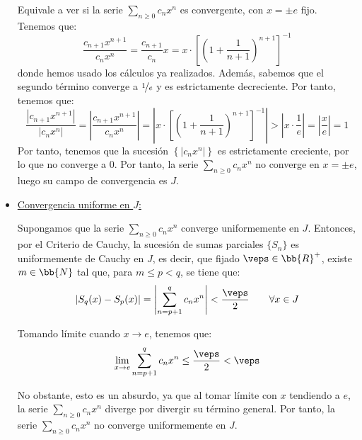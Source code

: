 \begin{ejercicio}
\begin{itemize}
        Equivale a ver si la serie
        $\sum\limits_{n\geq 0}c_nx^n$ es convergente, con $x=\pm e$ fijo. Tenemos que:
        \begin{equation*}
            \frac{c_{n+1}x^{n+1}}{c_nx^n} = \frac{c_{n+1}}{c_n}x = x\cdot \left[\left(1+\frac{1}{n+1}\right)^{n+1}\right]^{-1}
        \end{equation*}
        donde hemos usado los cálculos ya realizados. Además, sabemos que el segundo término converge a $\nicefrac{1}{e}$ y es estrictamente
        decreciente. Por tanto, tenemos que:
        \begin{equation*}
            \frac{\left|c_{n+1}x^{n+1}\right|}{\left|c_nx^n\right|}
            = \left|\frac{c_{n+1}x^{n+1}}{c_nx^n}\right|
            = \left|x\cdot \left[\left(1+\frac{1}{n+1}\right)^{n+1}\right]^{-1}\right|
            > \left|x\cdot \frac{1}{e}\right| = \left|\frac{x}{e}\right|=1
        \end{equation*}
        Por tanto, tenemos que la sucesión $\left\{|c_nx^n|\right\}$ es estrictamente creciente, por lo que no converge a $0$.
        Por tanto, la serie $\sum\limits_{n\geq 0}c_nx^n$ no converge en $x=\pm e$, luego su campo
        de convergencia es $J$.
        
        
        \item \ul{Convergencia uniforme en $J$:}
        
        Supongamos que la serie $\sum\limits_{n\geq 0}c_nx^n$ converge uniformemente en $J$. Entonces, por el Criterio de Cauchy, la sucesión de sumas parciales
        $\{S_n\}$ es uniformemente de Cauchy en $J$, es decir, que fijado $\veps\in \bb{R}^+$, existe $m\in \bb{N}$ tal que, para $m\leq p < q$, se tiene que:
        \begin{equation*}
            |S_q(x) - S_p(x)| = \left|\sum_{n=p+1}^q c_nx^n\right| < \frac{\veps}{2} \qquad \forall x\in J
        \end{equation*}

        Tomando límite cuando $x\to e$, tenemos que:
        \begin{equation*}
            \lim_{x\to e}\sum_{n=p+1}^q c_nx^n \leq \frac{\veps}{2} < \veps
        \end{equation*}

        No obstante, esto es un absurdo, ya que al tomar límite con $x$ tendiendo a $e$, la serie $\sum\limits_{n\geq 0}c_nx^n$ diverge por divergir
        su término general. Por tanto, la serie $\sum\limits_{n\geq 0}c_nx^n$ no converge uniformemente en $J$.
    \end{itemize}
\end{ejercicio}


